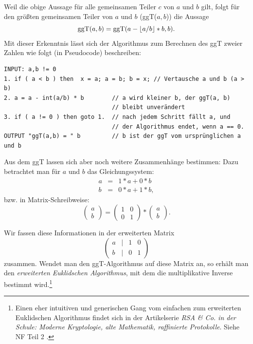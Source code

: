 \begin{refsegment}
Weil die obige Aussage für alle gemeinsamen Teiler $c$ von $a$ und $b$ gilt,
folgt für den größten gemeinsamen Teiler von $a$ und $b$ (ggT($a,b$)) die
Aussage $$ {\rm ggT}(a,b) = {\rm ggT}(a - \lfloor a/b \rfloor * b, b). $$
Mit dieser Erkenntnis lässt sich der Algorithmus zum Berechnen des ggT zweier
Zahlen wie folgt (in Pseudocode) beschreiben:

\begin{verbatim}
INPUT: a,b != 0
1. if ( a < b ) then  x = a; a = b; b = x; // Vertausche a und b (a > b)
2. a = a - int(a/b) * b        // a wird kleiner b, der ggT(a, b)
                               // bleibt unverändert
3. if ( a != 0 ) then goto 1.  // nach jedem Schritt fällt a, und
                               // der Algorithmus endet, wenn a == 0.
OUTPUT "ggT(a,b) = " b         // b ist der ggT vom ursprünglichen a und b
\end{verbatim}


Aus dem ggT lassen sich aber noch weitere Zusammenhänge bestimmen:
Dazu betrachtet man für $a$ und $b$ das Gleichungssystem:
\begin{eqnarray*}
 a & = & 1*a + 0*b \nonumber\\
 b & = & 0*a + 1*b, \nonumber
\end{eqnarray*}
bzw. in Matrix-Schreibweise:
$$ \left(\begin{array}{c}a \\ b\end{array}\right) =
   \left(\begin{array}{cc} 1 & 0 \\ 0 & 1 \end{array}\right) *
   \left(\begin{array}{c} a \\ b \end{array} \right).$$

 Wir fassen diese Informationen in der erweiterten Matrix
$$\left(\begin{array}{cccc} a & | & 1 & 0 \\ b & | & 0 & 1 \end{array} \right)$$
zusammen. Wendet man den ggT-Algorithmus auf diese Matrix an, so erhält man den
{\em erweiterten Euklidschen Algorithmus}, mit dem die multiplikative Inverse
bestimmt wird.\footnote{%
  Einen eher intuitiven und generischen Gang vom einfachen zum erweiterten
  Euklidschen Algorithmus findet sich in der Artikelserie {\em RSA \& Co.
  in der Schule: Moderne Kryptologie, alte Mathematik, raffinierte Protokolle}.
  Siehe NF Teil 2 \cite{Witten2006}.
}


\end{refsegment}

